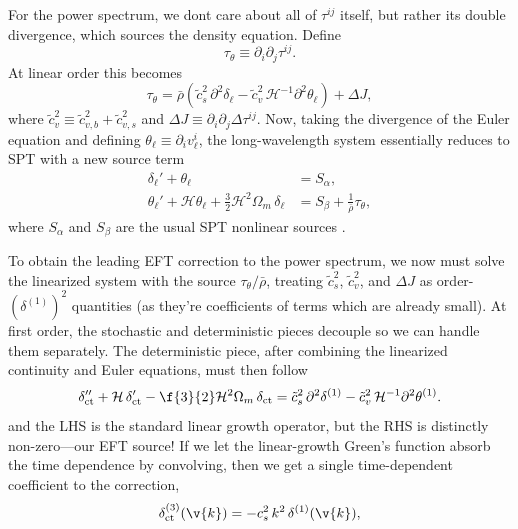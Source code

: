 For the power spectrum, we dont  care about all of $ \tau^{ij} $ itself, but rather its double divergence, which sources the density equation. Define
\begin{equation}
    \tau_\theta \equiv \partial_i\partial_j\tau^{ij}.
\end{equation}
At linear order this becomes
\begin{equation}
    \tau_\theta
    =
    \bar\rho
    \left(
        \tilde c_s^2\,\partial^2\delta_\ell
        - \tilde c_v^2\,\mathcal{H}^{-1}\partial^2\theta_\ell
    \right)
    + \Delta J,
\end{equation}
where $ \tilde c_v^2 \equiv \tilde c_{v,b}^2+\tilde c_{v,s}^2 $ and
$ \Delta J \equiv \partial_i\partial_j\Delta\tau^{ij} $.  Now, taking the divergence of the Euler equation and defining
$ \theta_\ell\equiv \partial_i v_\ell^i $, the long-wavelength system essentially reduces to SPT with a new source term
\begin{align}
    \delta_\ell' + \theta_\ell &= S_\alpha, \\
    \theta_\ell' + \mathcal{H}\theta_\ell
    + \frac{3}{2}\mathcal{H}^2\Omega_m\,\delta_\ell
    &= S_\beta + \frac{1}{\bar\rho}\tau_\theta,
\end{align}
where $ S_\alpha $ and $ S_\beta $ are the usual SPT nonlinear sources \citep{CarrascoEtAl2012,Baldauf2020}. 

To obtain the leading EFT correction to the power spectrum, we now must solve the linearized system
with the source $\tau_\theta/\bar\rho $, treating $\tilde c_s^2 $, $\tilde c_v^2 $, and $\Delta J $ as
order-$(\delta^{(1)})^2 $ quantities (as they're 
coefficients of terms which are already small). At first order, the stochastic and deterministic pieces decouple so we can handle them separately. The deterministic piece, after combining the linearized continuity and Euler
equations, must then follow
\begin{equation}
    \delta_{\rm ct}''
    + \mathcal{H}\,\delta_{\rm ct}'
    - \f{3}{2}\mathcal{H}^2\Omega_m\,\delta_{\rm ct}
    = \tilde c_s^2\,\partial^2\delta^{(1)}
      - \tilde c_v^2\,\mathcal{H}^{-1}\partial^2\theta^{(1)}.
\end{equation}
and the LHS is the standard linear growth operator, but the RHS is distinctly non-zero---our EFT source! If we let the linear-growth Green's function absorb the time dependence by convolving, then we get a single time-dependent coefficient to the correction,
\begin{equation}
    \delta_{\rm ct}^{(3)}(\v{k})
    =
    -c_s^2\,k^2\,\delta^{(1)}(\v{k}),
\end{equation}


